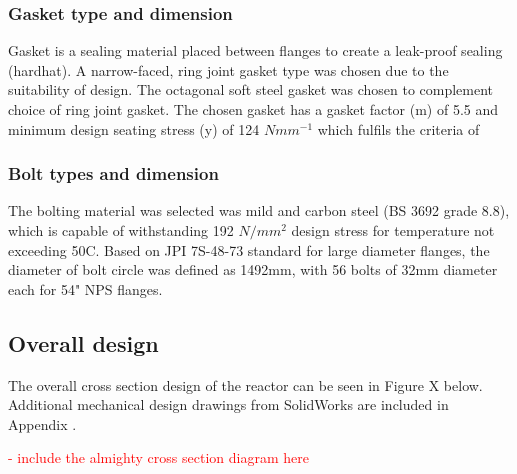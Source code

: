 \subsubsection{Gasket type and dimension}
Gasket is a sealing material placed between flanges to create a leak-proof sealing (hardhat). A narrow-faced, ring joint gasket type was chosen due to the suitability of design. The octagonal soft steel gasket was chosen to complement choice of ring joint gasket. The chosen gasket has a gasket factor (m) of 5.5 and minimum design seating stress (y) of 124 $Nmm^{-1}$ which fulfils the criteria of

\subsubsection{Bolt types and dimension}
The bolting material was selected was mild and carbon steel (BS 3692 grade 8.8), which is capable of withstanding 192 $N/mm^2$ design stress for temperature not exceeding 50C. Based on JPI 7S-48-73 standard for large diameter flanges, the diameter of bolt circle was defined as 1492mm, with 56 bolts of 32mm diameter each for 54" NPS flanges. 

\subsection{Overall design}
The overall cross section design of the reactor can be seen in Figure X below. Additional mechanical design drawings from SolidWorks are included in Appendix .

\textcolor{red}{- include the almighty cross section diagram here}
